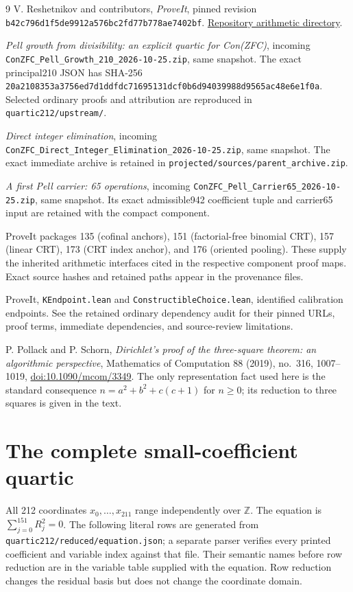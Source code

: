 \documentclass[10pt,letterpaper]{article}
\theoremstyle{remark}\newtheorem{remark}[theorem]{Remark}
\newcommand{\Z}{\mathbb Z}\newcommand{\N}{\mathbb N}
\newcommand{\pathtext}[1]{\nolinkurl{#1}}
\begin{document}
\begin{thebibliography}{9}
V. Reshetnikov and contributors, \emph{ProveIt}, pinned revision
\pathtext{b42c796d1f5de9912a576bc2fd77b778ae7402bf}.
\href{https://github.com/VladimirReshetnikov/ProveIt/tree/b42c796d1f5de9912a576bc2fd77b778ae7402bf/Computability/DiophantineConsistency}{Repository arithmetic directory}.

\emph{Pell growth from divisibility: an explicit quartic for Con(ZFC)},
incoming \pathtext{ConZFC_Pell_Growth_210_2026-10-25.zip}, same snapshot.
The exact principal210 JSON has SHA-256
\pathtext{20a2108353a3756ed7d1ddfdc71695131dcf0b6d94039988d9565ac48e6e1f0a}.
Selected ordinary proofs and attribution are reproduced in
\pathtext{quartic212/upstream/}.

\emph{Direct integer elimination}, incoming
\pathtext{ConZFC_Direct_Integer_Elimination_2026-10-25.zip}, same snapshot.
The exact immediate archive is retained in
\pathtext{projected/sources/parent_archive.zip}.

\emph{A first Pell carrier: 65 operations}, incoming
\pathtext{ConZFC_Pell_Carrier65_2026-10-25.zip}, same snapshot.
Its exact admissible942 coefficient tuple and carrier65 input are retained
with the compact component.

ProveIt packages 135 (cofinal anchors), 151 (factorial-free binomial CRT),
157 (linear CRT), 173 (CRT index anchor), and 176 (oriented pooling).
These supply the inherited arithmetic interfaces cited in the respective
component proof maps. Exact source hashes and retained paths appear in
the provenance files.

ProveIt, \pathtext{KEndpoint.lean} and
\pathtext{ConstructibleChoice.lean}, identified calibration endpoints.
See the retained ordinary dependency audit for their pinned URLs, proof
terms, immediate dependencies, and source-review limitations.

P. Pollack and P. Schorn, \emph{Dirichlet's proof of the three-square
theorem: an algorithmic perspective}, Mathematics of Computation 88
(2019), no.\ 316, 1007--1019,
\href{https://doi.org/10.1090/mcom/3349}{doi:10.1090/mcom/3349}.
The only representation fact used here is
the standard consequence $n=a^2+b^2+c(c+1)$ for $n\ge0$; its reduction to
three squares is given in the text.
\end{thebibliography}

\clearpage\appendix
\section{The complete small-coefficient quartic}\label{app:literal}

All 212 coordinates $x_0,\ldots,x_{211}$ range independently over $\Z$.
The equation is $\sum_{j=0}^{151}R_j^2=0$. The following literal rows are
generated from \pathtext{quartic212/reduced/equation.json}; a separate
parser verifies every printed coefficient and variable index against that
file. Their semantic names before row reduction are in the variable table
supplied with the equation. Row reduction changes the residual basis but
does not change the coordinate domain.


\end{document}
